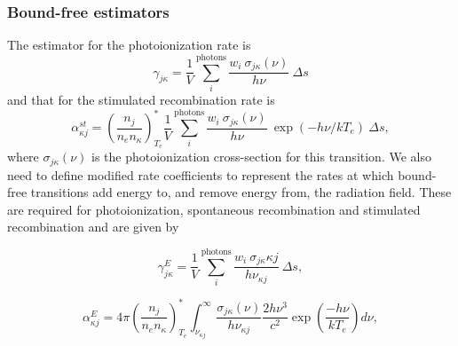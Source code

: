 \subsubsection{Bound-free estimators}
The estimator for the photoionization rate is 
\begin{equation}
\gamma_{j\kappa} = \frac{1}{V} \sum_i^{\mathrm{photons}} 
\frac{w_i~\sigma_{j\kappa}({\nu})}{h \nu}~\Delta s
\end{equation}
and that for the stimulated recombination rate is
\begin{equation}
\alpha_{\kappa j}^{st} =\left( \frac{n_j}{n_e n_\kappa} \right)^*_{T_e}
\frac{1}{V} \sum_i^{\mathrm{photons}} 
\frac{w_i~\sigma_{j\kappa}({\nu})}{h \nu}
~\exp(-h\nu/kT_e)~\Delta s,
\end{equation}
where $\sigma_{j\kappa} (\nu)$ is the photoionization cross-section for this transition.
We also need to define modified rate coefficients to represent
the rates at which bound-free transitions add energy to, and remove energy from, 
the radiation field. These are required for photoionization, 
spontaneous recombination and stimulated recombination and are given by

\begin{equation}
\gamma^E_{j\kappa} = \frac{1}{V} \sum_i^{\mathrm{photons}} 
\frac{w_i~\sigma_{j\kappa}{\kappa j}}{h \nu_{\kappa j}}~\Delta s, 
\end{equation}

\begin{equation}
\alpha^E_{\kappa j} = 4\pi \left( \frac{n_j}{n_e n_\kappa} \right)^*_{T_e}
 \int^\infty_{\nu_{\kappa j}} 
\frac{\sigma_{j \kappa}(\nu)}{h \nu_{\kappa j}} \frac{2 h \nu^3}{c^2} 
\exp \left( \frac{- h \nu}{k T_e} \right) d\nu,
\end{equation}

